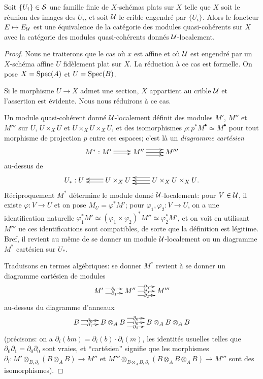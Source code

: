 \documentclass[oneside]{book}
\begin{document}
\begin{theorem}\label{I:1-4-5}
Soit $\{U_i\}\in\mathcal{S}$ une famille finie de $X$-schémas plats sur $X$ telle que 
$X$ soit le réunion des images des $U_i$, et soit $\mathcal{U}$ le crible engendré par 
$\{U_i\}$. Alors le foncteur $E\mapsto E_{\mathcal{U}}$ est une équivalence de la 
catégorie des modules quasi-cohérents sur $X$ avec la catégorie des modules 
quasi-cohérents donnés $\mathcal{U}$-localement.
\end{theorem}
\begin{proof}
Nous ne traiterons que le cas où $x$ est affine et où $\mathcal{U}$ est engendré par 
un $X$-schéma affine $U$ fidèlement plat sur $X$. La réduction à ce cas est 
formelle. On pose $X=\operatorname{Spec}(A)$ et $U=\operatorname{Spec}(B)$. 

Si le morphisme $U\to X$ admet une section, $X$ appartient au crible $\mathcal{U}$ et 
l'assertion est évidente. Nous nous réduirons à ce cas. 

Un module quasi-cohérent donné $\mathcal{U}$-localement définit des modules $M'$, $M''$ 
et $M'''$ sur $U$, $U\times_X U$ et $U\times_X U\times_X U$, et des 
isomorphismes $\rho:p^* M^\bullet\simeq M^\bullet$ pour tout morphisme de 
projection $p$ entre ces espaces; c'est là un \emph{diagramme cartésien} 
\[\xymatrix{
  M^* : M' \ar@<2pt>[r] \ar@<-2pt>[r] 
    & M'' \ar[r] \ar@<4pt>[r] \ar@<-4pt>[r] 
    & M'''
}\]
au-dessus de 
\[\xymatrix{
  U_* : U 
    & U\times_X U \ar@<2pt>[l] \ar@<-2pt>[l] 
    & U\times_X U\times_X U \ar[l] \ar@<4pt>[l] \ar@<-4pt>[l] \mbox{.}
}\]
Réciproquement $M^*$ détermine le module donné $\mathcal{U}$-localement: pour 
$V\in\mathcal{U}$, il existe $\varphi:V\to U$ et on pose $M_U=\varphi^* M'$; 
pour $\varphi_1,\varphi_2:V\to U$, on a une identification naturelle 
$\varphi_1^* M'\simeq (\varphi_1\times \varphi_2)^* M'' \simeq \varphi_2^* M'$, 
et on voit en utilisant $M'''$ ue ces identifications sont compatibles, de 
sorte que la définition est légitime. Bref, il revient au même de se donner un 
module $\mathcal{U}$-localement ou un diagramme $M^*$ cartésien sur $U_*$. 

Traduisons en termes algébriques: se donner $M^*$ revient à se donner un 
diagramme cartésien de modules 
\[\xymatrix{
  M' \ar@<3pt>[r]|-{\partial_0} \ar@<-3pt>[r]|-{\partial_1} 
    & M'' \ar@<6pt>[r]|-{\partial_0} \ar[r]|-{\partial_0} \ar@<-6pt>[r]|-{\partial_2}
    & M'''
}\]
au-dessus du diagramme d'anneaux 
\[\xymatrix{
  B \ar@<3pt>[r]|-{\partial_0} \ar@<-3pt>[r]|-{\partial_1} 
    & B\otimes_A B \ar@<6pt>[r]|-{\partial_0} \ar[r]|-{\partial_0} \ar@<-6pt>[r]|-{\partial_2} 
    & B\otimes_A B\otimes_A B
}\]
(précisons: on a $\partial_i(b m)=\partial_i(b)\cdot\partial_i(m)$, les 
identités usuelles telles que $\partial_0\partial_1=\partial_0\partial_0$ 
sont vraies, et ``cartésien'' signifie que les morphismes 
$\partial_i:M'\otimes_{B,\partial_i}(B\otimes_A B)\to M''$ et 
$M'''\otimes_{B\otimes_A B,\partial_i}(B\otimes_A B\otimes_A B)\to M'''$ sont 
des isomorphismes). 


\end{proof}
\end{document}
